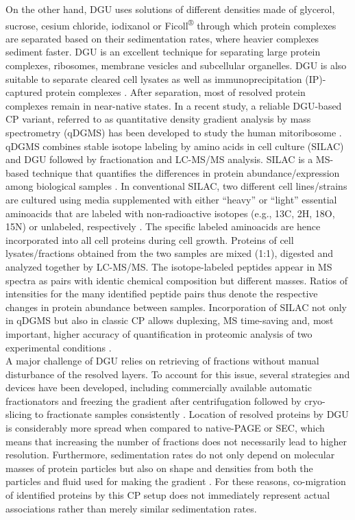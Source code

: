 On the other hand, DGU uses solutions of different densities made of glycerol, sucrose, cesium chloride, iodixanol or Ficoll\textsuperscript{®} through which protein complexes are separated based on their sedimentation rates, where heavier complexes sediment faster. DGU is an excellent technique for separating large protein complexes, ribosomes, membrane vesicles and subcellular organelles. DGU is also suitable to separate cleared cell lysates as well as immunoprecipitation (IP)-captured protein complexes \cite{Caudron-Herger_2019, Lee_2013}. After separation, most of resolved protein complexes remain in near-native states. In a recent study, a reliable DGU-based CP variant, referred to as quantitative density gradient analysis by mass spectrometry (qDGMS) has been developed to study the human mitoribosome \cite{Palenikova_2021a}. qDGMS combines stable isotope labeling by amino acids in cell culture (SILAC) and DGU followed by fractionation and LC-MS/MS analysis. SILAC is a MS-based technique that quantifies the differences in protein abundance/expression among biological samples \cite{Ong_2002}. In conventional SILAC, two different cell lines/strains are cultured using media supplemented with either “heavy” or “light” essential aminoacids that are labeled with non-radioactive isotopes (e.g., 13C, 2H, 18O, 15N) or unlabeled, respectively \cite{Geiger_2011}. The specific labeled aminoacids are hence incorporated into all cell proteins during cell growth. Proteins of cell lysates/fractions obtained from the two samples are mixed (1:1), digested and analyzed together by LC-MS/MS. The isotope-labeled peptides appear in MS spectra as pairs with identic chemical composition but different masses. Ratios of intensities for the many identified peptide pairs thus denote the respective changes in protein abundance between samples. Incorporation of SILAC not only in qDGMS but also in classic CP allows duplexing, MS time-saving and, most important, higher accuracy of quantification in proteomic analysis of two experimental conditions \cite{Palenikova_2021a, Palenikova_2021b}.\\
A major challenge of DGU relies on retrieving of fractions without manual disturbance of the resolved layers. To account for this issue, several strategies and devices have been developed, including commercially available automatic fractionators and freezing the gradient after centrifugation followed by cryo-slicing to fractionate samples consistently \cite{Yu_2016}. Location of resolved proteins by DGU is considerably more spread when compared to native-PAGE or SEC, which means that increasing the number of fractions does not necessarily lead to higher resolution. Furthermore, sedimentation rates do not only depend on molecular masses of protein particles but also on shape and densities from both the particles and fluid used for making the gradient \cite{Cole_2008}. For these reasons, co-migration of identified proteins by this CP setup does not immediately represent actual associations rather than merely similar sedimentation rates.

